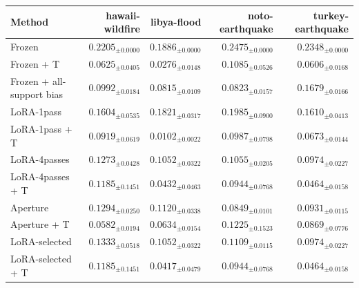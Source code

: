 \begin{tabular}{lrrrr}
\toprule
Method & hawaii-wildfire & libya-flood & noto-earthquake & turkey-earthquake \\
\midrule
Frozen & $0.2205_{\pm 0.0000}$ & $0.1886_{\pm 0.0000}$ & $0.2475_{\pm 0.0000}$ & $0.2348_{\pm 0.0000}$ \\
Frozen + T & $0.0625_{\pm 0.0405}$ & $0.0276_{\pm 0.0148}$ & $0.1085_{\pm 0.0526}$ & $0.0606_{\pm 0.0168}$ \\
Frozen + all-support bias & $0.0992_{\pm 0.0184}$ & $0.0815_{\pm 0.0109}$ & $0.0823_{\pm 0.0157}$ & $0.1679_{\pm 0.0166}$ \\
LoRA-1pass & $0.1604_{\pm 0.0535}$ & $0.1821_{\pm 0.0317}$ & $0.1985_{\pm 0.0900}$ & $0.1610_{\pm 0.0413}$ \\
LoRA-1pass + T & $0.0919_{\pm 0.0619}$ & $0.0102_{\pm 0.0022}$ & $0.0987_{\pm 0.0798}$ & $0.0673_{\pm 0.0144}$ \\
LoRA-4passes & $0.1273_{\pm 0.0428}$ & $0.1052_{\pm 0.0322}$ & $0.1055_{\pm 0.0205}$ & $0.0974_{\pm 0.0227}$ \\
LoRA-4passes + T & $0.1185_{\pm 0.1451}$ & $0.0432_{\pm 0.0463}$ & $0.0944_{\pm 0.0768}$ & $0.0464_{\pm 0.0158}$ \\
Aperture & $0.1294_{\pm 0.0250}$ & $0.1120_{\pm 0.0338}$ & $0.0849_{\pm 0.0101}$ & $0.0931_{\pm 0.0115}$ \\
Aperture + T & $0.0582_{\pm 0.0194}$ & $0.0634_{\pm 0.0154}$ & $0.1225_{\pm 0.1523}$ & $0.0869_{\pm 0.0776}$ \\
LoRA-selected & $0.1333_{\pm 0.0518}$ & $0.1052_{\pm 0.0322}$ & $0.1109_{\pm 0.0115}$ & $0.0974_{\pm 0.0227}$ \\
LoRA-selected + T & $0.1185_{\pm 0.1451}$ & $0.0417_{\pm 0.0479}$ & $0.0944_{\pm 0.0768}$ & $0.0464_{\pm 0.0158}$ \\
\bottomrule
\end{tabular}
